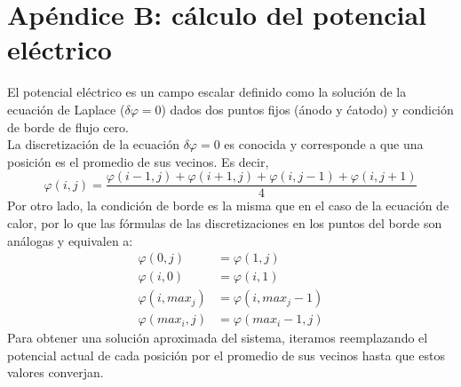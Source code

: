 \documentclass[a4paper]{article}
\begin{document}
\newpage
\section{Apéndice B: cálculo del potencial eléctrico}

El potencial eléctrico es un campo escalar definido como la solución 
de la ecuación de Laplace ($\delta \varphi = 0$) dados dos puntos 
fijos (ánodo y ćatodo) y condición de borde de flujo cero.\\
La discretización de la ecuación $\delta \varphi = 0$ es conocida y 
corresponde a que una posición es el promedio de sus vecinos. 
Es decir, $$\varphi(i, j) = \frac{\varphi(i-1, j) + \varphi(i+1, j) + \varphi(i, j-1) + \varphi(i, j+1)}{4}$$
Por otro lado, la condición de borde es la misma que en el caso de 
la ecuación de calor, por lo que las fórmulas de las discretizaciones 
en los puntos del borde son análogas y equivalen a:
\begin{equation*}
\begin{aligned}
\varphi(0,j) & = \varphi(1,j) \\ 
\varphi(i,0) & = \varphi(i,1) \\
\varphi(i,max_j) & = \varphi(i,max_j-1) \\ 
\varphi(max_i,j) & = \varphi(max_i-1,j)
\end{aligned}
\end{equation*}
Para obtener una solución aproximada del sistema, iteramos reemplazando el potencial actual de cada posición por el promedio de sus vecinos hasta que estos valores converjan.
\end{document}
